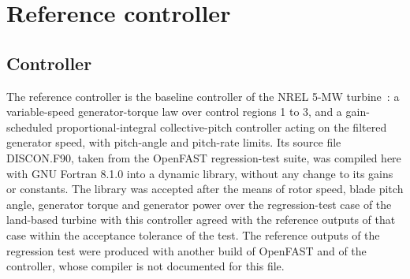 \section{Reference controller}
\label{sec:reference}

\subsection{Controller}
\label{subsec:discon}
{\color{revQ1}
The reference controller is the baseline controller of the NREL 5-MW turbine~\cite{jonkman2009}: a variable-speed generator-torque law over control regions 1 to 3, and a gain-scheduled proportional-integral collective-pitch controller acting on the filtered generator speed, with pitch-angle and pitch-rate limits. Its source file DISCON.F90, taken from the OpenFAST regression-test suite, was compiled here with GNU Fortran 8.1.0 into a dynamic library, without any change to its gains or constants. The library was accepted after the means of rotor speed, blade pitch angle, generator torque and generator power over the regression-test case of the land-based turbine with this controller agreed with the reference outputs of that case within the acceptance tolerance of the test. The reference outputs of the regression test were produced with another build of OpenFAST and of the controller, whose compiler is not documented for this file.
}

